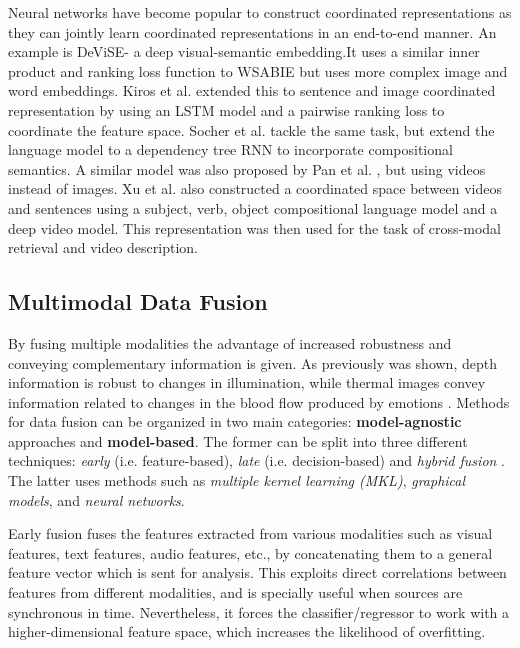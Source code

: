 Neural networks have become popular to construct coordinated representations as they can jointly learn coordinated representations in an end-to-end manner. An example is DeViSE- a deep visual-semantic embedding.It uses a similar inner product and ranking loss function to WSABIE but uses more complex image and word embeddings. 
Kiros et al. \cite{Kiros2014unifying} extended this to
sentence and image coordinated representation by using an LSTM model and a pairwise ranking loss to coordinate the
feature space. Socher et al. \cite{Socher2014grounded} tackle the same task, but extend the language model to a dependency tree RNN to incorporate compositional semantics. A similar model was
also proposed by Pan et al. \cite{Pan2016jointly}, but using videos instead of images. Xu et al. \cite{Xu2015jointly} also constructed a coordinated space between videos and sentences using a subject, verb,
object compositional language model and a deep video model. This representation was then used for the task of cross-modal retrieval and video description.


\subsection{Multimodal Data Fusion}
\label{sec:dataFusion}

By fusing multiple modalities the advantage of increased robustness and conveying complementary information is given. As previously was shown, depth information is robust to changes in illumination, while thermal images convey information related to changes in the
blood flow produced by emotions \cite{Corneanu2016survey}. 
Methods for data fusion can be organized in two main categories: \textbf{model-agnostic} approaches and \textbf{model-based}. The former can be split into three different techniques: \textit{early} (i.e. feature-based), \textit{late} (i.e. decision-based) and \textit{hybrid fusion} \cite{Baltruvsaitis2017multimodal}. The latter uses methods such as \textit{multiple kernel learning (MKL)}, \textit{graphical models}, and \textit{neural networks}.

Early fusion fuses the features extracted from various modalities such as visual features, text features, audio features, etc., by concatenating them to a general feature vector which is sent for analysis. This exploits direct correlations between features from different modalities, and is specially useful when sources are synchronous
in time. Nevertheless, it forces the classifier/regressor to work with a higher-dimensional feature space, which increases
the likelihood of overfitting. 

